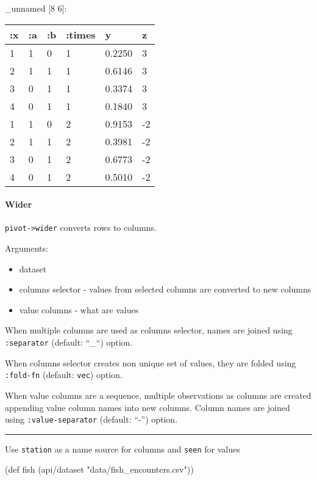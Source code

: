 \documentclass[]{article}
\newenvironment{Shaded}{\begin{snugshade}}{\end{snugshade}}
\newcommand{\StringTok}[1]{\textcolor[rgb]{0.31,0.60,0.02}{#1}}
\newcommand{\FunctionTok}[1]{\textcolor[rgb]{0.00,0.00,0.00}{#1}}
\newcommand{\BuiltInTok}[1]{#1}
\newcommand{\NormalTok}[1]{#1}
\providecommand{\tightlist}{%
  \setlength{\itemsep}{0pt}\setlength{\parskip}{0pt}}
\let\oldparagraph\paragraph
\renewcommand{\paragraph}[1]{\oldparagraph{#1}\mbox{}}
\begin{document}
\_unnamed {[}8 6{]}:

\begin{longtable}[]{@{}llllll@{}}
\toprule
:x & :a & :b & :times & y & z\tabularnewline
\midrule
\endhead
1 & 1 & 0 & 1 & 0.2250 & 3\tabularnewline
2 & 1 & 1 & 1 & 0.6146 & 3\tabularnewline
3 & 0 & 1 & 1 & 0.3374 & 3\tabularnewline
4 & 0 & 1 & 1 & 0.1840 & 3\tabularnewline
1 & 1 & 0 & 2 & 0.9153 & -2\tabularnewline
2 & 1 & 1 & 2 & 0.3981 & -2\tabularnewline
3 & 0 & 1 & 2 & 0.6773 & -2\tabularnewline
4 & 0 & 1 & 2 & 0.5010 & -2\tabularnewline
\bottomrule
\end{longtable}

\paragraph{Wider}\label{wider}

\texttt{pivot-\textgreater{}wider} converts rows to columns.

Arguments:

\begin{itemize}
\tightlist
\item
  dataset
\item
  columns selector - values from selected columns are converted to new
  columns
\item
  value columns - what are values
\end{itemize}

When multiple columns are used as columns selector, names are joined
using \texttt{:separator} (default: ``\_``) option.

When columns selector creates non unique set of values, they are folded
using \texttt{:fold-fn} (default: \texttt{vec}) option.

When value columns are a sequence, multiple observations as columns are
created appending value column names into new columns. Column names are
joined using \texttt{:value-separator} (default: ``-'') option.

\begin{center}\rule{0.5\linewidth}{0.5pt}\end{center}

Use \texttt{station} as a name source for columns and \texttt{seen} for
values

\begin{Shaded}
\begin{Highlighting}[]
\NormalTok{(}\BuiltInTok{def}\FunctionTok{ fish }\NormalTok{(api/dataset }\StringTok{"data/fish_encounters.csv"}\NormalTok{))}
\end{Highlighting}
\end{Shaded}
\end{document}
